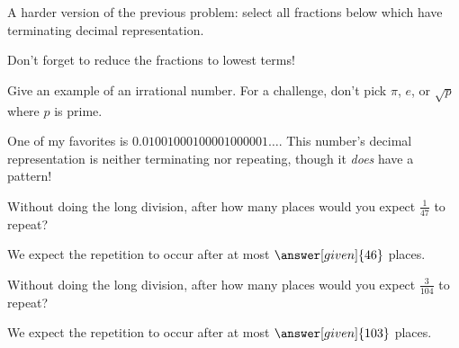 \documentclass[nooutcomes]{ximera}
\begin{document}
\begin{problem}
A harder version of the previous problem: select all fractions below which have terminating decimal representation.
\begin{selectAll}
\end{selectAll}
\begin{hint}
Don't forget to reduce the fractions to lowest terms!
\end{hint}
\end{problem}



\begin{problem}
Give an example of an irrational number.  For a challenge, don't pick $\pi$, $e$, or $\sqrt{p}$ where $p$ is prime.

\begin{freeResponse}
\begin{hint}
One of my favorites is $0.01001000100001000001\dots$.  This number's decimal representation is neither terminating nor repeating, though it {\em does} have a pattern!
\end{hint}
\end{freeResponse}

\end{problem}



\begin{problem}
Without doing the long division, after how many places would you expect $\frac{1}{47}$ to repeat?

\begin{prompt}
We expect the repetition to occur after at most $\answer[given]{46}$ places.
\end{prompt}
\end{problem}


\begin{problem}
Without doing the long division, after how many places would you expect $\frac{3}{104}$ to repeat?

\begin{prompt}
We expect the repetition to occur after at most $\answer[given]{103}$ places.
\end{prompt}
\end{problem}
\end{document}
